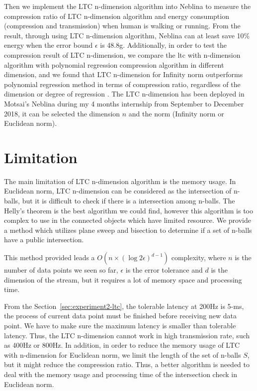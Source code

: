 Then we implement the LTC n-dimension algorithm into Neblina to measure the
compression ratio of LTC n-dimension algorithm and energy consumption
(compression and transmission) when human is walking or running. From the
result, through using LTC n-dimension algorithm, Neblina can at least save 10\%
energy when the error bound $\epsilon$ is 48.8g. Additionally, in order to test
the compression result of LTC n-dimension, we compare the \acrshort{ltc} with
n-dimension algorithm with polynomial regression compression algorithm in
different dimension, and we found that LTC n-dimension for Infinity norm
outperforms polynomial regression method in terms of compression ratio,
regardless of the dimension or degree of regression . The LTC n-dimension has been deployed in Motsai's Neblina
during my 4 months internship from September to December 2018, it can be
selected the dimension $n$ and the norm (Infinity norm or Euclidean norm).

\section{Limitation}


The main limitation of LTC n-dimension algorithm is the memory usage. In
Euclidean norm, LTC n-dimension can be considered as the intersection of
n-balls, but it is difficult to check if there is a intersection among n-balls.
The Helly's theorem is the best algorithm we could find, however this algorithm
is too complex to use in the connected objects which have limited resource.  We
provide a method which utilizes plane sweep and bisection to determine if a set
of n-balls have a public intersection.

This method provided leads a $O(n\times (\log{2\epsilon})^{d-1})$ complexity,
where $n$ is the number of data points we seen so far, $\epsilon$ is the error
tolerance and $d$ is the dimension of the stream, but it requires a lot of
memory space and processing time. 

From the Section~\ref{sec:experiment2-ltc}, the tolerable latency at 200Hz is
5-ms, the process of current data point must be finished before receiving new
data point. We have to make sure the maximum latency is smaller than tolerable
latency. Thus, the LTC n-dimension cannot work in high transmission rate, such
as 400Hz or 800Hz. In addition, in order to reduce the memory usage of LTC with
n-dimension for Euclidean norm, we limit the length of the set of n-balls $S$,
but it might reduce the compression ratio. Thus, a better algorithm is needed to
deal with the memory usage and processing time of the intersection check in
Euclidean norm.


